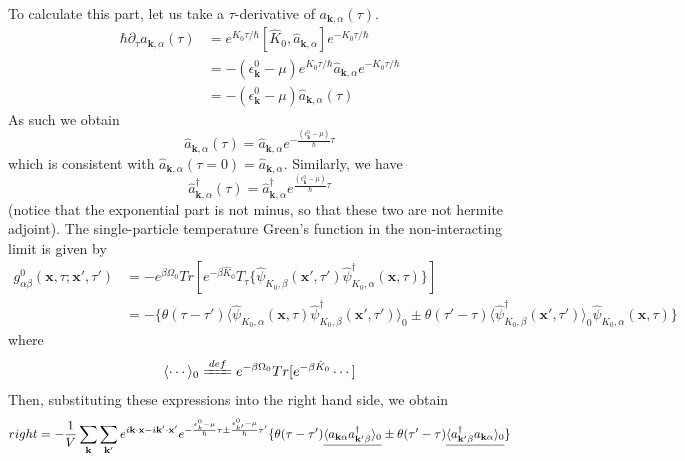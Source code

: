 To calculate this part, let us take a $\tau$-derivative of $a_{\mathbf{k},\alpha}(\tau)$.
$$
\begin{aligned}
\hbar\partial_{\tau}a_{\mathbf{k},\alpha}(\tau) & = e^{K_{0}\tau/\hbar} [\hat{K}_{0},\hat{a}_{\mathbf{k},\alpha}] e^{-K_{0}\tau/\hbar}\\
&=-(\epsilon_{\mathbf{k}}^{0}-\mu) e^{K_{0}\tau/\hbar} \hat{a}_{\mathbf{k},\alpha} e^{-K_{0}\tau/\hbar}\\
&=-(\epsilon_{\mathbf{k}}^{0}-\mu)\hat{a}_{\mathbf{k},\alpha}(\tau)
\end{aligned}
$$
As such we obtain
\begin{equation} \label{4.1.A}
\hat{a}_{\mathbf{k},\alpha}(\tau)=\hat{a}_{\mathbf{k},\alpha}e^{-\frac{(\epsilon_{\mathbf{k}}^{0}-\mu)}{\hbar}\tau}
\end{equation}
which is consistent with $\hat{a}_{\mathbf{k},\alpha}(\tau=0)=\hat{a}_{\mathbf{k},\alpha}$.
Similarly, we have
\[ \label{4.1.B}
\hat{a}_{\mathbf{k},\alpha}^{\dagger}(\tau)=\hat{a}_{\mathbf{k},\alpha}^{\dagger}e^{\frac{(\epsilon_{\mathbf{k}}^{0}-\mu)}{\hbar}\tau} \tag{$4.1.22^\prime$}
\]
(notice that the exponential part is not minus, so that these two are not hermite adjoint).
The single-particle temperature Green's function in the non-interacting limit is given by
\begin{equation}\label{eq2}
\begin{aligned}
g_{\alpha\beta}^{0}(\mathbf{x},\tau;\mathbf{x'},\tau')&=-e^{\beta\Omega_{0}}Tr\left[e^{-\beta\hat{K}_{0}} T_{\tau}\{\hat{\psi}_{K_{0},\beta}(\mathbf{x'},\tau') \hat{\psi}_{K_{0},\alpha}^{\dagger}(\mathbf{x},\tau)\}\right]\\
&=-\{\theta(\tau-\tau')\langle\hat{\psi}_{K_{0},\alpha}(\mathbf{x},\tau)\hat{\psi}_{K_{0},\beta}^{\dagger}(\mathbf{x'},\tau')\rangle_{0} \pm\theta(\tau'-\tau)\langle\hat{\psi}_{K_{0},\beta}^{\dagger}(\mathbf{x'},\tau')\rangle_{0}\hat{\psi}_{K_{0},\alpha}(\mathbf{x},\tau)\}
\end{aligned}
\end{equation}
where
$$
\langle\cdots\rangle_{0}\xlongequal{def} e^{-\beta\Omega_{0}}Tr[e^{-\beta\hat{K}_{0}}\cdots]
$$
Then, substituting these expressions into the right hand side, we obtain
$$
right=-\frac{1}{V}\sum_{\mathbf{k}}\sum_{\mathbf{k'}}e^{i\mathbf{k}\cdotp\mathbf{x}-i\mathbf{k'}\cdotp\mathbf{x'}} e^{-\frac{\epsilon_{k}^{0}-\mu}{\hbar}\tau\pm\frac{\epsilon_{k'}^{0}-\mu}{\hbar}\tau'} \{\theta(\tau-\tau') \uline{\langle a_{\mathbf{k}\alpha} a_{\mathbf{k'}\beta}^{\dagger}\rangle_{0}} \pm\theta(\tau'-\tau) \uline{\langle a_{\mathbf{k'}\beta}^{\dagger} a_{\mathbf{k}\alpha}\rangle_{0}}\}
$$

